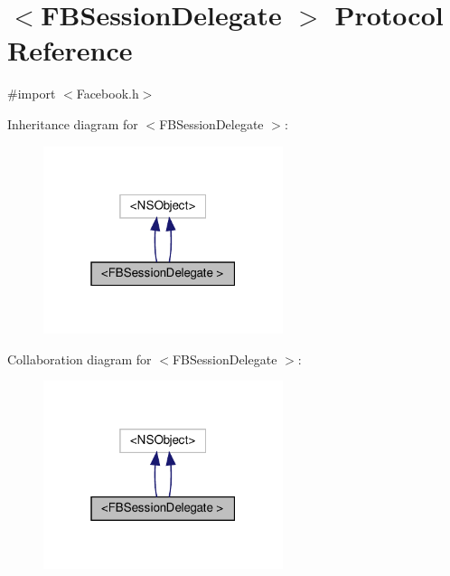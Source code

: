 \hypertarget{protocolFBSessionDelegate_01-p}{}\section{$<$F\+B\+Session\+Delegate $>$ Protocol Reference}
\label{protocolFBSessionDelegate_01-p}


{\ttfamily \#import $<$Facebook.\+h$>$}



Inheritance diagram for $<$F\+B\+Session\+Delegate $>$\+:
\nopagebreak
\begin{figure}[H]
\begin{center}
\leavevmode
\includegraphics[width=199pt]{protocolFBSessionDelegate_01-p__inherit__graph}
\end{center}
\end{figure}


Collaboration diagram for $<$F\+B\+Session\+Delegate $>$\+:
\nopagebreak
\begin{figure}[H]
\begin{center}
\leavevmode
\includegraphics[width=199pt]{protocolFBSessionDelegate_01-p__coll__graph}
\end{center}
\end{figure}
